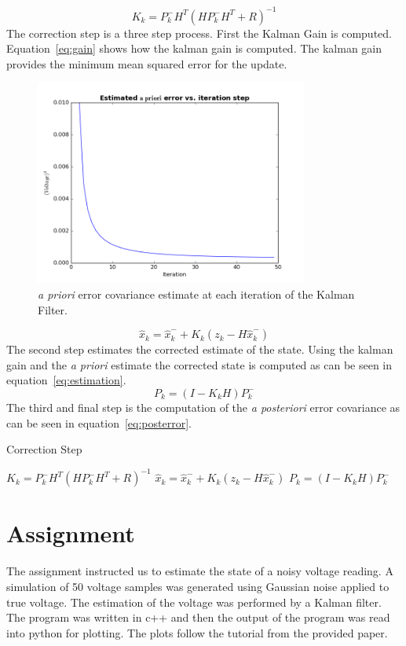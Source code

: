 \documentclass[letter]{IEEEtran}
\begin{document}
\begin{equation}
\label{eq:gain}
K_k = P_k^- H^T(HP_k^-H^T + R)^{-1}
\end{equation}
The correction step is a three step process.  First the Kalman Gain is computed. Equation~\ref{eq:gain} shows how the kalman gain is computed. The kalman gain provides the minimum mean squared error for the update.
\begin{figure}[!t]
\centering
\includegraphics[width=9cm]{error_small}
\caption{\emph{a priori} error covariance estimate at each iteration of the Kalman Filter.}
\label{fig:error}
\end{figure}

\begin{equation}
\label{eq:estimation}
\hat{x}_k = \hat{x}_k^- + K_k(z_k - H\hat{x}^-_k)
\end{equation}
The second step estimates the corrected estimate of the state. Using the kalman gain and the \emph{a priori} estimate  the corrected state is computed as can be seen in equation~\ref{eq:estimation}.
\begin{equation}
\label{eq:posterror}
P_k = (I - K_kH)P^-_k
\end{equation}
The third and final step is the computation of the \emph{a posteriori} error covariance as can be seen in equation~\ref{eq:posterror}.
\begin{algorithm}
\caption{Correction Step}
\label{alg:correct}
\begin{algorithmic}[1]
\STATE $K_k = P_k^- H^T(HP_k^-H^T + R)^{-1}$
\STATE $\hat{x}_k = \hat{x}_k^- + K_k(z_k - H\hat{x}^-_k)$
\STATE $P_k = (I - K_kH)P^-_k$
\end{algorithmic}
\end{algorithm}
\section{Assignment}
The assignment instructed us to estimate the state of a noisy voltage reading. A simulation of 50 voltage samples was generated using Gaussian noise applied to true voltage. The estimation of the voltage was performed by a Kalman filter. The program was written in c++ and then the output of the program was read  into python for plotting. The plots follow the tutorial from the provided paper.
\end{document}
